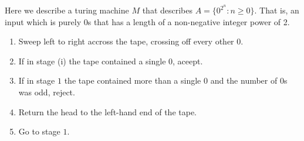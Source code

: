 \begin{example}
    Here we describe a turing machine $M$ that describes $A = \{ 0^{2^n} : n \geq 0 \}$. That is, an input which is purely $0$s that has a length of a non-negative integer power of 2.
    \begin{enumerate}
        \item Sweep left to right accross the tape, crossing off every other $0$.
        \item If in stage (i) the tape contained a single $0$, aceept.
        \item If in stage $1$ the tape contained more than a single $0$ and the number of $0$s was odd, reject.
        \item Return the head to the left-hand end of the tape.
        \item Go to stage $1$.
    \end{enumerate}
\end{example}
